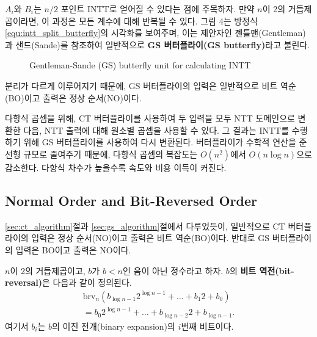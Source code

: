 $A_i$와 $B_i$는 $n/2$ 포인트 INTT로 얻어질 수 있다는 점에 주목하자. 만약 $n$이 2의 거듭제곱이라면, 이 과정은 모든 계수에 대해 반복될 수 있다. 그림 4는 방정식 \ref{equ:intt_split_butterfly}의 시각화를 보여주며, 이는 제안자인 젠틀맨(Gentleman)과 샌드(Sande)를 참조하여 일반적으로 \textbf{GS 버터플라이(GS butterfly)}라고 불린다.
\begin{figure}[H]
\centering
{}
\caption{Gentleman-Sande (GS) butterfly unit for calculating INTT}
\label{fig:gs_butterfly}
\end{figure}

분리가 다르게 이루어지기 때문에, GS 버터플라이의 입력은 일반적으로 비트 역순(BO)이고 출력은 정상 순서(NO)이다.

다항식 곱셈을 위해, CT 버터플라이를 사용하여 두 입력을 모두 NTT 도메인으로 변환한 다음, NTT 출력에 대해 원소별 곱셈을 사용할 수 있다. 그 결과는 INTT를 수행하기 위해 GS 버터플라이를 사용하여 다시 변환된다. 버터플라이가 수학적 연산을 준선형 규모로 줄여주기 때문에, 다항식 곱셈의 복잡도는 $O(n^2)$에서 $O(n \log n)$으로 감소한다. 다항식 차수가 높을수록 속도와 비용 이득이 커진다.

\subsection{Normal Order and Bit-Reversed Order}

\ref{sec:ct_algorithm}절과 \ref{sec:gs_algorithm}절에서 다루었듯이, 일반적으로 CT 버터플라이의 입력은 정상 순서(NO)이고 출력은 비트 역순(BO)이다. 반대로 GS 버터플라이의 입력은 BO이고 출력은 NO이다.
\begin{tcolorbox}[colback=white, boxrule=0.7pt, sharp corners]
\begin{definition}
$n$이 2의 거듭제곱이고, $b$가 $b < n$인 음이 아닌 정수라고 하자. $b$의 \textbf{비트 역전(bit-reversal)}은 다음과 같이 정의된다.
\begin{equation}
\begin{split}
\text{brv}_n (b_{\log n-1} 2^{\log n-1} + \dots + b_1 2 + b_0) \\
= b_0 2^{\log n-1} + \dots + b_{\log n-2} 2 + b_{\log n-1}.
\end{split}
\end{equation}
여기서 $b_i$는 $b$의 이진 전개(binary expansion)의 $i$번째 비트이다.
\end{definition}
\end{tcolorbox}

